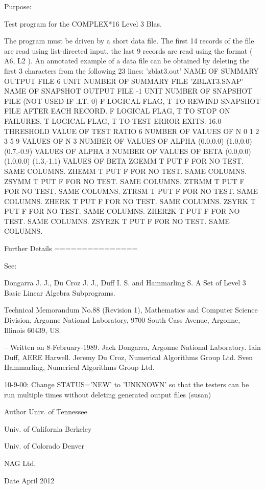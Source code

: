 \begin{DoxyParagraph}{Purpose\+: }
\begin{DoxyVerb} Test program for the COMPLEX*16       Level 3 Blas.

 The program must be driven by a short data file. The first 14 records
 of the file are read using list-directed input, the last 9 records
 are read using the format ( A6, L2 ). An annotated example of a data
 file can be obtained by deleting the first 3 characters from the
 following 23 lines:
 'zblat3.out'      NAME OF SUMMARY OUTPUT FILE
 6                 UNIT NUMBER OF SUMMARY FILE
 'ZBLAT3.SNAP'     NAME OF SNAPSHOT OUTPUT FILE
 -1                UNIT NUMBER OF SNAPSHOT FILE (NOT USED IF .LT. 0)
 F        LOGICAL FLAG, T TO REWIND SNAPSHOT FILE AFTER EACH RECORD.
 F        LOGICAL FLAG, T TO STOP ON FAILURES.
 T        LOGICAL FLAG, T TO TEST ERROR EXITS.
 16.0     THRESHOLD VALUE OF TEST RATIO
 6                 NUMBER OF VALUES OF N
 0 1 2 3 5 9       VALUES OF N
 3                 NUMBER OF VALUES OF ALPHA
 (0.0,0.0) (1.0,0.0) (0.7,-0.9)       VALUES OF ALPHA
 3                 NUMBER OF VALUES OF BETA
 (0.0,0.0) (1.0,0.0) (1.3,-1.1)       VALUES OF BETA
 ZGEMM  T PUT F FOR NO TEST. SAME COLUMNS.
 ZHEMM  T PUT F FOR NO TEST. SAME COLUMNS.
 ZSYMM  T PUT F FOR NO TEST. SAME COLUMNS.
 ZTRMM  T PUT F FOR NO TEST. SAME COLUMNS.
 ZTRSM  T PUT F FOR NO TEST. SAME COLUMNS.
 ZHERK  T PUT F FOR NO TEST. SAME COLUMNS.
 ZSYRK  T PUT F FOR NO TEST. SAME COLUMNS.
 ZHER2K T PUT F FOR NO TEST. SAME COLUMNS.
 ZSYR2K T PUT F FOR NO TEST. SAME COLUMNS.

 
 Further Details
 ===============

 See:

    Dongarra J. J., Du Croz J. J., Duff I. S. and Hammarling S.
    A Set of Level 3 Basic Linear Algebra Subprograms.

    Technical Memorandum No.88 (Revision 1), Mathematics and
    Computer Science Division, Argonne National Laboratory, 9700
    South Cass Avenue, Argonne, Illinois 60439, US.

 -- Written on 8-February-1989.
    Jack Dongarra, Argonne National Laboratory.
    Iain Duff, AERE Harwell.
    Jeremy Du Croz, Numerical Algorithms Group Ltd.
    Sven Hammarling, Numerical Algorithms Group Ltd.

    10-9-00:  Change STATUS='NEW' to 'UNKNOWN' so that the testers
              can be run multiple times without deleting generated
              output files (susan)\end{DoxyVerb}
 
\end{DoxyParagraph}
\begin{DoxyAuthor}{Author}
Univ. of Tennessee 

Univ. of California Berkeley 

Univ. of Colorado Denver 

N\+A\+G Ltd. 
\end{DoxyAuthor}
\begin{DoxyDate}{Date}
April 2012 
\end{DoxyDate}
